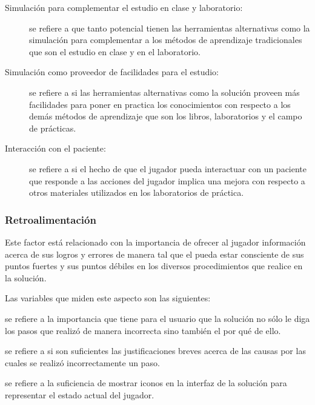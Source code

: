 \begin{description}
\item[Simulación para complementar el estudio en clase y laboratorio:] se
    refiere a que tanto potencial tienen las herramientas alternativas como la
    simulación para complementar a los métodos de aprendizaje tradicionales
    que son el estudio en clase y en el laboratorio.

\item[Simulación como proveedor de facilidades para el estudio:] se refiere a si las
    herramientas alternativas como la solución proveen más facilidades para
    poner en practica los conocimientos con respecto a los demás métodos de
    aprendizaje que son los libros, laboratorios y el campo de prácticas.

\item[Interacción con el paciente:] se refiere a si el hecho de que el jugador
    pueda interactuar con un paciente que responde a las acciones del jugador 
    implica una mejora con respecto a otros materiales utilizados en los 
    laboratorios de práctica.

\end{description}


\subsubsection{Retroalimentación}
\label{sec:sub_retroalimentacion}

Este factor está relacionado con la importancia de ofrecer al jugador
información acerca de sus logros y errores de manera tal que el pueda estar
consciente de sus puntos fuertes y sus puntos débiles en los diversos
procedimientos que realice en la solución.

Las variables que miden este aspecto son las siguientes:

\begin{description}[style=unboxed]

\item[Detalles de los pasos realizados incorrectamente:] se refiere a 
    la importancia que tiene para el usuario que la solución no sólo le 
    diga los pasos que realizó de manera incorrecta sino también el por qué 
    de ello.

\item[Retroalimentación suficiente respecto a los pasos realizados:] se refiere 
    a si son suficientes las justificaciones breves acerca de las causas por las 
    cuales se realizó incorrectamente un paso.

\item[Representación iconográfica de conceptos y acciones en la \Gls{gui}:] 
    se refiere a la suficiencia de mostrar iconos en la interfaz de 
    la solución para representar el estado actual del jugador.

\end{description}

